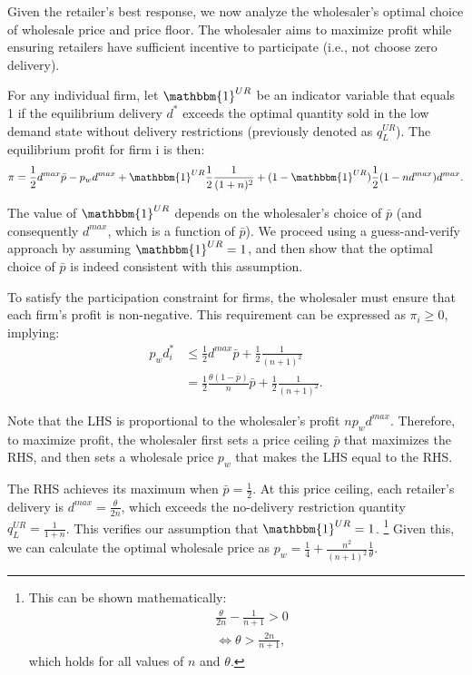 \documentclass[12pt]{article}
\begin{document}
Given the retailer's best response, we now analyze the wholesaler's optimal choice of wholesale price and price floor. The wholesaler aims to maximize profit while ensuring retailers have sufficient incentive to participate (i.e., not choose zero delivery).

For any individual firm, let $\mathbbm{1}^{UR}$ be an indicator variable that equals 1 if the equilibrium delivery $d^*$ exceeds the optimal quantity sold in the low demand state without delivery restrictions (previously denoted as $q^{UR}_L$). The equilibrium profit for firm i is then:
\begin{equation}
	\pi = \frac{1}{2}d^{max}\bar{p} -  p_wd^{max}
	+ \mathbbm{1}^{UR}\frac{1}{2}\frac{1}{(1 + n)^2} + (1 - \mathbbm{1}^{UR})\frac{1}{2}(1 - nd^{max})d^{max}.
\end{equation}

The value of $\mathbbm{1}^{UR}$ depends on the wholesaler's choice of $\bar{p}$ (and consequently $d^{max}$, which is a function of $\bar{p}$). We proceed using a guess-and-verify approach by assuming $\mathbbm{1}^{UR} = 1$, and then show that the optimal choice of $\bar{p}$ is indeed consistent with this assumption.

To satisfy the participation constraint for firms, the wholesaler must ensure that each firm's profit is non-negative. This requirement can be expressed as $\pi_i \geq 0$, implying:
\begin{equation}
	\begin{aligned}
		p_wd^*_i &\leq  \frac{1}{2}d^{max}\bar{p} + \frac{1}{2}\frac{1}{(n + 1)^2}\\
		&= \frac{1}{2}\frac{\theta(1 - \bar{p})}{n}\bar{p} + \frac{1}{2}\frac{1}{(n + 1)^2}.
	\end{aligned}
\end{equation}

Note that the LHS is proportional to the wholesaler's profit $n  p_w d^{max}$. Therefore, to maximize profit, the wholesaler first sets a price ceiling $\bar{p}$ that maximizes the RHS, and then sets a wholesale price $ p_w$ that makes the LHS equal to the RHS.

The RHS achieves its maximum when $\bar{p} = \frac{1}{2}$. At this price ceiling, each retailer's delivery is $d^{max} = \frac{\theta}{2n}$, which exceeds the no-delivery restriction quantity $q^{UR}_L = \frac{1}{1 + n}$. This verifies our assumption that $\mathbbm{1}^{UR} = 1$. \footnote{This can be shown mathematically:
	\begin{equation}
		\begin{aligned}
			& \frac{\theta}{2n} - \frac{1}{n + 1} > 0 \\
			& \iff \theta > \frac{2n}{n + 1},
		\end{aligned}
	\end{equation}
	which holds for all values of $n$ and $\theta$.
} Given this, we can calculate the optimal wholesale price as $ p_w = \frac{1}{4} + \frac{n^2}{(n + 1)^2}\frac{1}{\theta}$.
\end{document}
